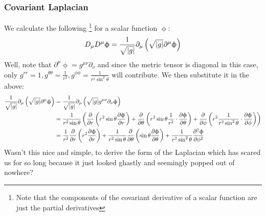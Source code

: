 \subsubsection{Covariant Laplacian}
We calculate the following \footnote{Note that the components of the covariant derivative of a scalar function are just the partial derivatives} for a scalar function $\upphi$:
\begin{align*}
    D_\mu D^\mu \upphi = \frac{1}{\sqrt{|g|}}\partial_\mu \left( \sqrt{|g|}\partial^\mu \upphi \right)
\end{align*}
Well, note that $\partial^\mu \upphi = g^{\mu \nu}\partial_\nu$ and since the metric tensor is diagonal in this case, only $g^{rr}=1, g^{\theta\theta}=\frac{1}{r^2}, g^{\phi\phi} = \frac{1}{r^2\sin^2\theta}$ will contribute. We then substitute it in the above:
\begin{align*}
    \frac{1}{\sqrt{|g|}} \partial_\mu \left( \sqrt{|g|} \partial^\mu \upphi \right)
    &= \frac{1}{\sqrt{|g|}} \partial_\mu \left( \sqrt{|g|} g^{\mu \nu} \partial_\nu \upphi \right) \\
    &= \frac{1}{r^2 \sin\theta} 
       \left(  \pdv{}{r} \left( r^2 \sin\theta \pdv{\upphi}{r} \right)
        + \pdv{}{\theta} \left( r^2 \sin\theta \frac{1}{r^2}\cdot\pdv{\upphi}{\theta} \right)
        + \pdv{}{\phi} \left( r^2  \frac{1}{r^2\sin^2\theta}\cdot\pdv{\upphi}{\phi} \right) \right)\\
    &=\frac{1}{r^2} \pdv{}{r} \left( r^2  \pdv{\upphi}{r} \right) + \frac{1}{r^2\sin\theta}\pdv{}{\theta} \left(  \sin\theta \pdv{\upphi}{\theta} \right) + \frac{1}{r^2\sin^2\theta}\pdv[2]{\upphi}{\phi}
\end{align*}
Wasn't this nice and simple, to derive the form of the Laplacian which has scared us for so long because it just looked ghastly and seemingly popped out of nowhere? 
